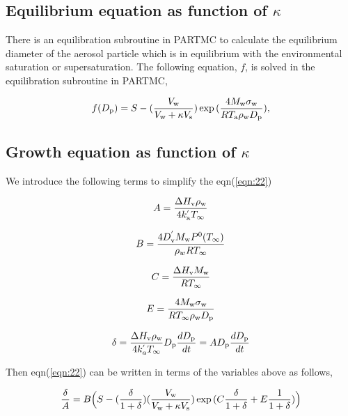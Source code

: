 \documentclass[12pt]{article}
\begin{document}
\subsection{Equilibrium equation as function of $\kappa$}

There is an equilibration subroutine in PARTMC to calculate the equilibrium diameter of the aerosol particle which is in equilibrium with the environmental saturation or supersaturation.
The following equation, $f$, is solved in the equilibration subroutine in PARTMC,


\begin{equation}\label{eqn:19a}
f(D_{\rm p})=S-(\frac{V_{\rm w}}{V_{\rm w} + \kappa V_{\rm s}})   \exp{(\frac{4 M_{\rm w} \sigma_{\rm w}}{R T_{\rm a} \rho_{\rm w} D_{\rm p}})},
\end{equation}


\subsection{Growth equation as function of $\kappa$}

We introduce the following terms to simplify the eqn(\ref{eqn:22})

\begin{equation}
A=\frac{\Delta H_{\rm v} \rho_{\rm w}}{4 k_{\rm a}^{'} T_{\infty}}
\end{equation}

\begin{equation}
B=\frac{4 D_{\rm v}^{'} M_{\rm w} P^{\rm 0}(T_{\infty})}{\rho_w R T_{\infty}}
\end{equation}

\begin{equation}
C=\frac{\Delta H_{\rm v} M_{\rm w}}{R T_{\infty}}
\end{equation}

\begin{equation}
E=\frac{4 M_{\rm w}\sigma_{\rm w}}{R T_{\infty} \rho_{\rm w} D_{\rm p}}
\end{equation}

\begin{equation}\label{eqn:23}
\delta=\frac{\Delta H_{\rm v} \rho_{\rm w}}{4 k_a^{'} T_{\infty}} D_{\rm p} \frac{d D_{\rm p}}{dt}=A D_{\rm p} \frac{d D_{\rm p}}{dt}
\end{equation}

Then eqn(\ref{eqn:22}) can be written in terms of the variables above as follows,

\begin{equation}\label{eqn:22a}
\frac{\delta}{A}=B\Big(S-(\frac{\delta}{1+\delta}) (\frac{V_{\rm w}}{V_{\rm w}+\kappa V_{\rm s}})\exp{(C \frac{\delta}{1+\delta} +E \frac{1}{1+\delta})}\Big)
\end{equation}
\end{document}
